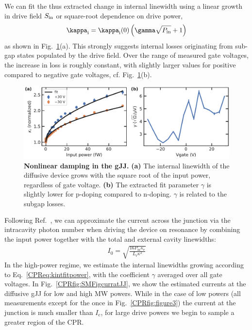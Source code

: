 We can fit the thus extracted change in internal linewidth using a linear growth in drive field $S_{\rm in}$ or square-root dependence on drive power,
\begin{align}
\kappa_\text{i}=\kappa_\text{i}(0)\left(\gamma\sqrt{P_{\rm in}}+1\right)
\label{CPReq:kintfitpower}
\end{align}
as shown in Fig.~\ref{CPRfig:SMFig-lossrates-power}(a).
%
This strongly suggests internal losses originating from sub-gap states populated by the drive field.
%
Over the range of measured gate voltages, the increase in loss is roughly constant, with slightly larger values for positive compared to negative gate voltages, cf. Fig.~\ref{CPRfig:SMFig-lossrates-power}(b).

\begin{figure}
	\centering
	\includegraphics[width=\linewidth]{chapter-gJJ-CPR/figs/SMFigure-lossrates-power}
	\caption{
		\textbf{Nonlinear damping in the gJJ.}
		\textbf{(a)} The internal linewidth of the diffusive device grows with the square root of the input power, regardless of gate voltage.
		\textbf{(b)} The extracted fit parameter $\gamma$ is slightly lower for p-doping compared to n-doping.
		$\gamma$ is related to the subgap losses.
	}
	\label{CPRfig:SMFig-lossrates-power}
\end{figure}

Following Ref.~\cite{schmidtCurrentDetectionUsing2020}, we can approximate the current across the junction via the intracavity photon number when driving the device on resonance by combining the input power together with the total and external cavity linewidths:
%
\begin{align}
I_0 = \sqrt{\frac{16 P_\text{in} \kappa_\text{e}}{L_\text{r} \kappa^2}}
\label{CPReq:curratJJ}
\end{align}
%
In the high-power regime, we estimate the internal linewidths growing according to Eq.~\ref{CPReq:kintfitpower}, with the coefficient $\gamma$ averaged over all gate voltages.
%
In Fig.~\ref{CPRfig:SMFigcurratJJ}, we show the estimated currents at the diffusive gJJ for low and high MW powers.
%
While in the case of low powers (all measurements except for the once in Fig.~\ref{CPRfig:figure3}) the current at the junction is much smaller than $I_\text{c}$, for large drive powers we begin to sample a greater region of the CPR.

